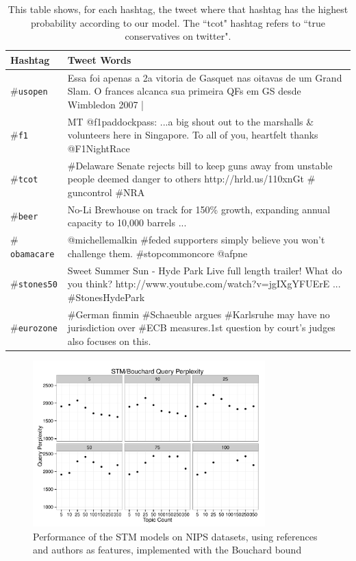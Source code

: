 \begin{table}
    \centering
    \begin{tabular}{| l || p{9cm} | } \hline 
        \bf{Hashtag} & %
        \bf{Tweet Words} \\ \hline
        $\#$\tt{usopen} & %
        Essa foi apenas a 2a vitoria de Gasquet nas oitavas de um Grand Slam. O frances alcanca sua primeira QFs em GS desde Wimbledon 2007 | \\ \hline
        $\#$\tt{f1} & %
         MT @f1paddockpass: ...a big shout out to the marshalls \& volunteers here in Singapore. To all of you, heartfelt thanks @F1NightRace \\ \hline
        $\#$\tt{tcot} & %
        $\#$Delaware Senate rejects bill to keep guns away from unstable people deemed danger to others http://hrld.us/110xnGt $\#$guncontrol $\#$NRA \\ \hline
        $\#$\tt{beer} & %
        No-Li Brewhouse on track for 150\% growth, expanding annual capacity to 10,000 barrels ... \\ \hline
        $\#$\tt{obamacare} & %
        @michellemalkin $\#$feded supporters simply believe you won't challenge them. $\#$stopcommoncore @afpne \\ \hline
        $\#$\tt{stones50} & %
        Sweet Summer Sun - Hyde Park Live full length trailer! What do you think? http://www.youtube.com/watch?v=jgIXgYFUErE ... $\#$StonesHydePark \\ \hline
        $\#$\tt{eurozone} & %
        $\#$German finmin $\#$Schaeuble argues $\#$Karlsruhe may have no jurisdiction over $\#$ECB measures.1st question by court's judges also focuses on this. \\ \hline
    \end{tabular}
    \caption{This table shows, for each hashtag, the tweet where that hashtag has the highest probability according to our model. The ``tcot" hashtag refers to ``true conservatives on twitter".}
    \label{tbl:generative}
\end{table}

\begin{figure}
\centering
    \includegraphics[width=0.8\textwidth]{plots/nips-stm-bou-kp.pdf}
    \caption{Performance of the STM models on NIPS datasets, using references and authors as features, implemented with the Bouchard bound}
    \label{fig:nips-stm-bou-p-all}
\end{figure}

